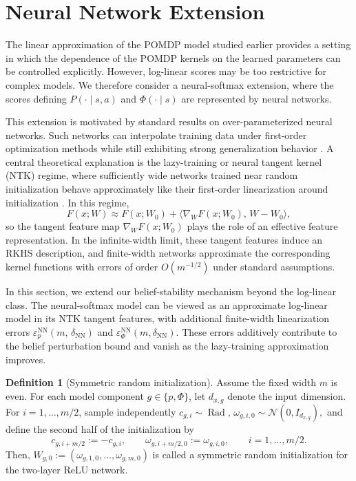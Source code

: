 \documentclass[10pt]{article} %
\theoremstyle{plain}
\theoremstyle{definition}
\newtheorem{definition}[theorem]{Definition}
\theoremstyle{remark}
\begin{document}
\section{Neural Network Extension}
\label{sec:nn-extension}





The linear approximation of the POMDP model studied earlier provides a setting in which the dependence of the POMDP kernels on the learned parameters can be controlled explicitly. However, log-linear scores may be too restrictive for complex models. We therefore consider a neural-softmax extension, where the scores defining \(P(\cdot\mid s,a)\) and \(\Phi(\cdot\mid s)\) are represented by neural networks.

This extension is motivated by standard results on over-parameterized neural networks. Such networks can interpolate training data under first-order optimization methods while still exhibiting strong generalization behavior \citep{Belkin2019,Bartlett2020,Zhang2021}. A central theoretical explanation is the lazy-training or neural tangent kernel (NTK) regime, where sufficiently wide networks trained near random initialization behave approximately like their first-order linearization around initialization \citep{JacotNTK2018,LiLiang2018,Du2019,OymakSoltanolkotabi2019,ChizatBach2019}. In this regime,
\[
F(x;W)\approx F(x;W_0)+\big\langle \nabla_W F(x;W_0),\,W-W_0\big\rangle ,
\]
so the tangent feature map \(\nabla_W F(x;W_0)\) plays the role of an effective feature representation. In the infinite-width limit, these tangent features induce an RKHS description, and finite-width networks approximate the corresponding kernel functions with errors of order \(O(m^{-1/2})\) under standard assumptions. 

In this section, we extend our belief-stability mechanism beyond the log-linear class. The neural-softmax model can be viewed as an approximate log-linear model in its NTK tangent features, with additional finite-width linearization errors \(\varepsilon_{p}^{\mathrm{NN}}(m,\,\delta_{\mathrm{NN}})\) and \(\varepsilon_\Phi^{\mathrm{NN}}(m, \delta_{\mathrm{NN}})\). These errors additively contribute to the belief perturbation bound and vanish as the lazy-training approximation improves.


\medskip
\begin{definition}[Symmetric random initialization]
\label{def:symmetric-random-initialization}
Assume the fixed width \(m\) is even. For each model component \(g\in\{p,\Phi\}\), let \(d_{x,g}\) denote the input dimension.
For \(i=1,\ldots,m/2\), sample independently
\(c_{g,i}\sim \operatorname{Rad},\,
\omega_{g,i,0}\sim \mathcal N(0,I_{d_{x,g}}),
\) and define the second half of the initialization by
\[
c_{g,i+m/2}:=-c_{g,i},
\qquad \omega_{g,i+m/2,0}:=\omega_{g,i,0}, \qquad i=1,\ldots,m/2 .
\]
Then,
\(
W_{g,0}:=(\omega_{g,1,0},\ldots,\omega_{g,m,0})
\) is called a symmetric random initialization for the two-layer ReLU network. 
\end{definition}
\end{document}

